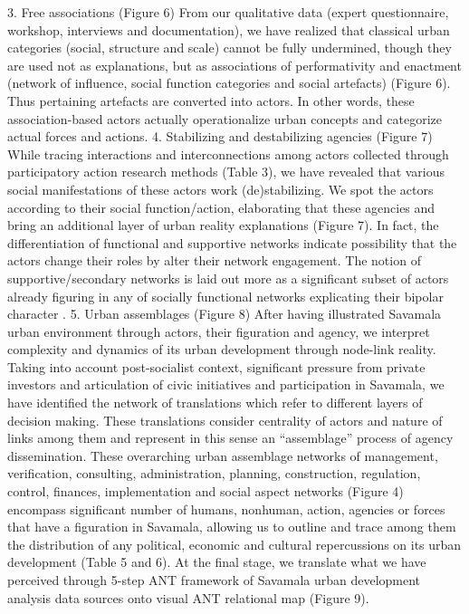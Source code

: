 \documentclass[11pt]{report}
\begin{document}
3.	Free associations (Figure 6)
From our qualitative data (expert questionnaire, workshop, interviews and documentation), we have realized that classical urban categories (social, structure and scale) cannot be fully undermined, though they are used not as explanations, but as associations of performativity and enactment (network of influence, social function categories and social artefacts) (Figure 6). Thus pertaining artefacts are converted into actors. In other words, these association-based actors actually operationalize urban concepts and categorize actual forces and actions.
4.	Stabilizing and destabilizing agencies (Figure 7)
While tracing interactions and interconnections among actors collected through participatory action research methods (Table 3), we have revealed that various social manifestations of these actors work (de)stabilizing. We spot the actors according to their social function/action, elaborating that these agencies and bring an additional layer of urban reality explanations (Figure 7). In fact, the differentiation of functional and supportive networks indicate possibility that the actors change their roles by alter their network engagement. The notion of supportive/secondary networks is laid out more as a significant subset of actors already figuring in any of socially functional networks explicating their bipolar character .  
5.	Urban assemblages (Figure 8)
After having illustrated Savamala urban environment through actors, their figuration and agency, we interpret complexity and dynamics of its urban development through node-link reality. Taking into account post-socialist context, significant pressure from private investors and articulation of civic initiatives and participation in Savamala, we have identified the network of translations which refer to different layers of decision making. These translations consider centrality of actors and nature of links among them and represent in this sense an “assemblage” process of agency dissemination. These overarching urban assemblage networks of management, verification, consulting, administration, planning, construction, regulation, control, finances, implementation and social aspect networks (Figure 4) encompass significant number of humans, nonhuman, action, agencies or forces that have a figuration in Savamala, allowing us to outline and trace among them the distribution of any political, economic and cultural repercussions on its urban development (Table 5 and 6). 
At the final stage, we translate what we have perceived through 5-step ANT framework of Savamala urban development analysis data sources onto visual ANT relational map (Figure 9). 
\end{document}
